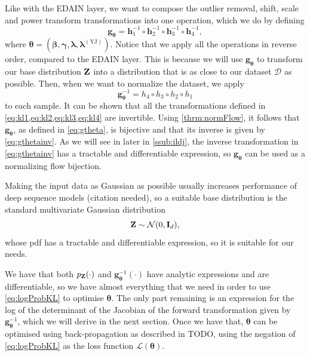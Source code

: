 \documentclass{statsmsc}
\begin{document}
Like with the \ac{EDAIN} layer, we want to compose the outlier removal, shift, scale and power
transform transformations into one operation, which we do by defining
\begin{equation}\label{eq:gtheta}
    \mathbf{g}_{\bm\theta}=\mathbf{h}_1^{-1} \circ  \mathbf{h}_2^{-1} \circ \mathbf{h}_3^{-1} \circ \mathbf{h}_4^{-1},
\end{equation}
where $\bm\theta=(\bm\beta, \bm\gamma, \bm\lambda, \bm\lambda^{(\textrm{YJ})})$.
Notice that we apply all the operations in reverse order, compared to the \ac{EDAIN} layer. This
is because we will use $\mathbf{g}_{\bm\theta}$ to transform our base distribution $\mathbf{Z}$ into
a distribution that is as close to our dataset $\mathcal{D}$ as possible. Then, when we want to
normalize the dataset, we apply
\begin{equation}\label{eq:gthetainv}
    \mathbf{g}_{\bm\theta}^{-1}=h_4 \circ h_3 \circ h_2 \circ h_1  
\end{equation}
to each sample.  It can be shown that all the transformations defined in
\cref{eq:kl1,eq:kl2,eq:kl3,eq:kl4} are invertible. Using \cref{thrm:normFlow}, it follows that
$\mathbf{g}_{\bm\theta}$, as defined in \cref{eq:gtheta}, is bijective and that its inverse
is given by \cref{eq:gthetainv}. As we will see in later in \cref{ssub:ildj},
the inverse transformation in \cref{eq:gthetainv} has a tractable and differentiable expression,
so $\mathbf{g}_{\bm\theta}$ can be used as a normalizing flow bijection.

Making the input data as Gaussian as possible usually increases performance of deep sequence models
(citation needed), so a suitable base distribution is the standard multivariate Gaussian distribution
\begin{equation}
    \mathbf{Z} \sim \mathcal{N}(0, \mathbf{I}_d),
\end{equation}
whose \ac{pdf} has a tractable and differentiable expression, so it is suitable for our needs.

We have that both $p_{\mathbf{Z}}(\cdot)$ and $\mathbf{g}_{\bm\theta}^{-1}(\cdot)$ have analytic expressions
and are differentiable, so we have almost everything that we need in order to use
\cref{eq:logProbKL} to optimise $\bm\theta$. The only part remaining is an expression for
the log of the determinant of the Jacobian of the forward transformation given by
$\mathbf{g}_{\bm\theta}^{-1}$, which we will derive in the next section. Once we have that,
$\bm\theta$ can be optimised using back-propagation as described in TODO, using the negation
of \cref{eq:logProbKL} as the loss function $\mathcal{L}(\bm\theta)$.
\end{document}
